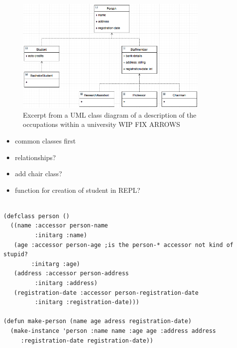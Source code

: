 \documentclass[oribibl]{llncs}
\begin{document}
\begin{figure}[]
    \centering
    \includegraphics[width=0.85\textwidth]{images/class-diagram.png}
    \caption{Excerpt from a UML class diagram of a description of the occupations within a university WIP FIX ARROWS}
    \label{fig:class-diagram}
\end{figure}


\begin{itemize}
\item common classes first
\item relationships?
\item add chair class?
\item function for creation of student in REPL?

\end{itemize}

\begin{listing}[]%
\begin{verbatim}

(defclass person ()
  ((name :accessor person-name
         :initarg :name)
   (age :accessor person-age ;is the person-* accessor not kind of stupid?
        :initarg :age)
   (address :accessor person-address
         :initarg :address)
   (registration-date :accessor person-registration-date
         :initarg :registration-date)))

(defun make-person (name age adress registration-date)
  (make-instance 'person :name name :age age :address address
     :registration-date registration-date))
     
\end{verbatim}
\caption{The basic \texttt{person} class WIP}
\label{lst:clossyntax}
\end{listing}
\end{document}
